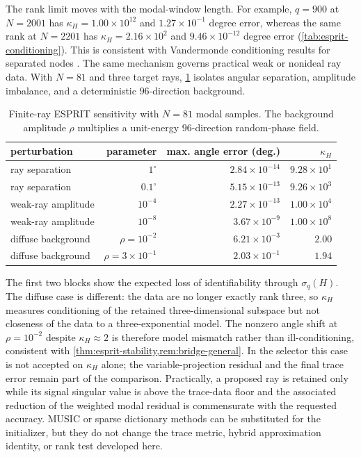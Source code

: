 \documentclass[11pt]{article}
\numberwithin{equation}{section}
\begin{document}
The rank limit moves with the modal-window length.  For example, $q=900$ at $N=2001$ has $\kappa_H=1.00\times10^{12}$ and $1.27\times10^{-1}$ degree error, whereas the same rank at $N=2201$ has $\kappa_H=2.16\times10^2$ and $9.46\times10^{-12}$ degree error (\cref{tab:esprit-conditioning}).  This is consistent with Vandermonde conditioning results for separated nodes \citep{Moitra2015,LiLiao2020}.
The same mechanism governs practical weak or nonideal ray data.  With $N=81$ and three target rays, \cref{tab:esprit-practical} isolates angular separation, amplitude imbalance, and a deterministic $96$-direction background.
\begin{table}[htbp]
\centering
\caption{Finite-ray ESPRIT sensitivity with $N=81$ modal samples.  The background amplitude $\rho$ multiplies a unit-energy $96$-direction random-phase field.}
\label{tab:esprit-practical}
\footnotesize
\begin{tabular}{lrrr}
\toprule
perturbation & parameter & max. angle error (deg.) & $\kappa_H$\\
\midrule
ray separation & $1^\circ$ & $2.84\times10^{-14}$ & $9.28\times10^1$\\
ray separation & $0.1^\circ$ & $5.15\times10^{-13}$ & $9.26\times10^3$\\
weak-ray amplitude & $10^{-4}$ & $2.27\times10^{-13}$ & $1.00\times10^4$\\
weak-ray amplitude & $10^{-8}$ & $3.67\times10^{-9}$ & $1.00\times10^8$\\
diffuse background & $\rho=10^{-2}$ & $6.21\times10^{-3}$ & $2.00$\\
diffuse background & $\rho=3\times10^{-1}$ & $2.03\times10^{-1}$ & $1.94$\\
\bottomrule
\end{tabular}
\end{table}
The first two blocks show the expected loss of identifiability through $\sigma_q(H)$.  The diffuse case is different: the data are no longer exactly rank three, so $\kappa_H$ measures conditioning of the retained three-dimensional subspace but not closeness of the data to a three-exponential model.  The nonzero angle shift at $\rho=10^{-2}$ despite $\kappa_H\approx2$ is therefore model mismatch rather than ill-conditioning, consistent with \cref{thm:esprit-stability,rem:bridge-general}.  In the selector this case is not accepted on $\kappa_H$ alone; the variable-projection residual and the final trace error remain part of the comparison.  Practically, a proposed ray is retained only while its signal singular value is above the trace-data floor and the associated reduction of the weighted modal residual is commensurate with the requested accuracy.  MUSIC or sparse dictionary methods can be substituted for the initializer, but they do not change the trace metric, hybrid approximation identity, or rank test developed here.
\end{document}
